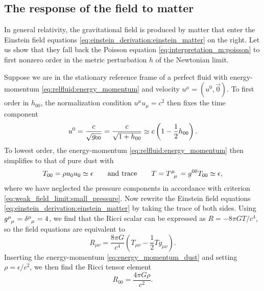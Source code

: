 \subsection{The response of the field to matter}
\label{sec:einstein_to_poisson}

In general relativity, the gravitational field is produced by matter that enter the Einstein field equations \eqref{eq:einstein_derivation:einstein_matter} on the right.
Let us show that they fall back the Poisson equation \eqref{eq:interpretation_m:poisson} to first nonzero order in the metric perturbation $h$ of the Newtonian limit.

Suppose we are in the stationary reference frame of a perfect fluid with energy-momentum \eqref{eq:relfluid:energy_momentum} and velocity $u^\mu = (u^0, \vec{0})$.
To first order in $h_{00}$, the normalization condition $u^\mu u_\mu = c^2$ then fixes the time component
\begin{equation}
	u^0 = \frac{c}{\sqrt{g_{00}}} = \frac{c}{\sqrt{1 + h_{00}}} \simeq c \left( 1 - \frac12 h_{00} \right) .
\end{equation}
To lowest order, the energy-momentum \eqref{eq:relfluid:energy_momentum} then simplifies to that of pure dust with
\begin{equation}
	T_{00} = \rho u_0 u_0 \taylor \epsilon
	\qquad \text{and trace} \qquad
	T = T\indices{^\mu_\mu} = g^{00} T_{00} \taylor \epsilon, 
\label{eq:energy_momentum_dust}
\end{equation}
where we have neglected the pressure components in accordance with criterion \eqref{eq:weak_field_limit:small_pressure}.
Now rewrite the Einstein field equations \eqref{eq:einstein_derivation:einstein_matter} by taking the trace of both sides.
Using $g\indices{^\mu_\mu} = \delta\indices{^\mu_\mu} = 4$, we find that the Ricci scalar can be expressed as $R = - 8 \pi G T / c^4$, so the field equations are equivalent to
\begin{equation}
	R_{\mu \nu} = \frac{8 \pi G}{c^4} \left( T_{\mu \nu} - \frac12 T g_{\mu \nu} \right) .
	\label{eq:einstein_rewritten}
\end{equation}
Inserting the energy-momentum \eqref{eq:energy_momentum_dust} and setting $\rho = \epsilon / c^2$, we then find the Ricci tensor element
\begin{equation}
	R_{00} = \frac{4 \pi G \rho}{c^2} .
	\label{eq:weak_field_limit:ricci_from_energy_momentum}
\end{equation}


